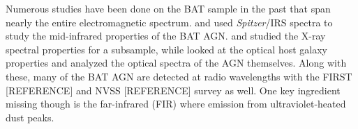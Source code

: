 Numerous studies have been done on the BAT sample in the past that span nearly the entire electromagnetic spectrum. \citet{Weaver:2010rt} and \citet{Melendez:2008pd} used \textit{Spitzer}/IRS spectra to study the mid-infrared properties of the BAT AGN. \cite{Winter:2009kx} and \cite{Vasudevan:2013dz} studied the X-ray spectral properties for a subsample, while \citet{Koss:2011vn} looked at the optical host galaxy properties and \citep{Winter:2010yq} analyzed the optical spectra of the AGN themselves. Along with these, many of the BAT AGN are detected at radio wavelengths with the FIRST [REFERENCE] and NVSS [REFERENCE] survey as well. One key ingredient missing though is the far-infrared (FIR) where emission from ultraviolet-heated dust peaks. 